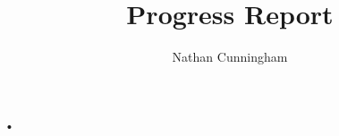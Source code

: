 \documentclass[10pt,a4paper,twoside]{article}
\author{Nathan Cunningham}
\title{Progress Report}
\begin{document}
\maketitle
•
\end{document}

